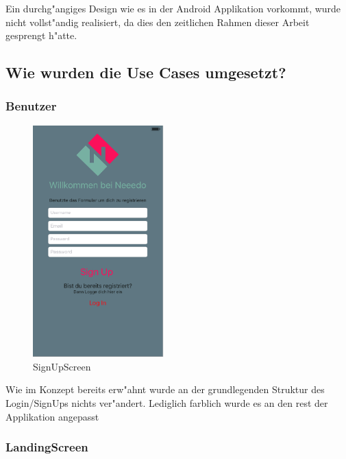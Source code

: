 Ein durchg"angiges Design wie es in der Android Applikation vorkommt, wurde nicht vollst"andig realisiert, da dies den zeitlichen Rahmen dieser Arbeit gesprengt h"atte. 

\subsection{Wie wurden die Use Cases umgesetzt?}

\subsubsection*{Benutzer}

\begin{figure}[H]
\begin{center}
\includegraphics[width=0.45\textwidth]{./Bilder/ioslogin.png}
\caption{SignUpScreen}
\label{fig:ioslogin}
\end{center}
\end{figure}

Wie im Konzept bereits erw"ahnt wurde an der grundlegenden Struktur des Login/SignUps nichts ver"andert. Lediglich farblich wurde es an den rest der Applikation angepasst

\subsubsection{LandingScreen} 

